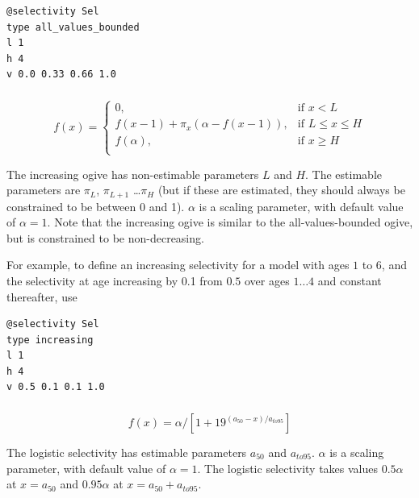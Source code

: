 {\small{\begin{verbatim}
@selectivity Sel
type all_values_bounded
l 1 
h 4 
v 0.0 0.33 0.66 1.0
\end{verbatim}}}

\subsubsection[Increasing]{}

\begin{equation} 
f(x)=\begin{cases}
	  0, & \text{if $x < L$} \\
	  f(x-1)+ \pi_x(\alpha-f(x-1)), & \text{if $L \le x \le H$} \\
	  f(\alpha), & \text{if $x \ge H$} \\  
  \end{cases}
\end{equation}

The increasing ogive has non-estimable parameters $L$ and $H$. The estimable parameters are $\pi_L$, $\pi_{L+1}$ \ldots $\pi_H$ (but if these are estimated, they should always be constrained to be between 0 and 1). $\alpha$ is a scaling parameter, with default value of $\alpha = 1$. Note that the increasing ogive is similar to the all-values-bounded ogive, but is constrained to be non-decreasing.

For example, to define an increasing selectivity for a model with ages $1$ to $6$, and the selectivity at age increasing by 0.1 from $0.5$ over ages $1 \ldots 4$ and constant thereafter, use

{\small{\begin{verbatim}
@selectivity Sel
type increasing
l 1 
h 4 
v 0.5 0.1 0.1 1.0
\end{verbatim}}}

\subsubsection[Logistic]{}

\begin{equation}
  f(x) = \alpha / [1+19^{(a_{50}-x)/a_{to95}}]
\end{equation}
 
The logistic selectivity has estimable parameters $a_{50}$ and $a_{to95}$. $\alpha$ is a scaling parameter, with default value of $\alpha = 1$. The logistic selectivity takes values $0.5 \alpha$ at $x=a_{50}$ and $0.95 \alpha$ at $x=a_{50}+a_{to95}$. 

